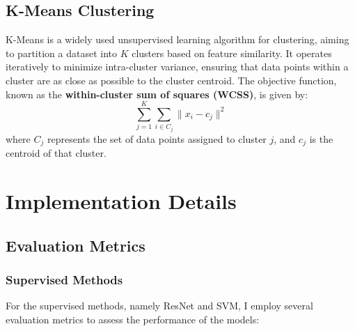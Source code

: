 \documentclass[12pt]{article}
\begin{document}
    \subsection{K-Means Clustering}  
    K-Means is a widely used unsupervised learning algorithm for clustering, aiming to partition a dataset into \( K \) clusters based on feature similarity. It operates iteratively to minimize intra-cluster variance, ensuring that data points within a cluster are as close as possible to the cluster centroid. The objective function, known as the \textbf{within-cluster sum of squares (WCSS)}, is given by:  
    \begin{equation*}
    \sum_{j=1}^{K} \sum_{i \in C_j} \| x_i - c_j \|^2
    \end{equation*}  
    where \( C_j \) represents the set of data points assigned to cluster \( j \), and \( c_j \) is the centroid of that cluster.

\section{Implementation Details}
    \subsection{Evaluation Metrics}
        \subsubsection{Supervised Methods}
        For the supervised methods, namely ResNet and SVM, I employ several evaluation metrics to assess the performance of the models:
        
\end{document}
